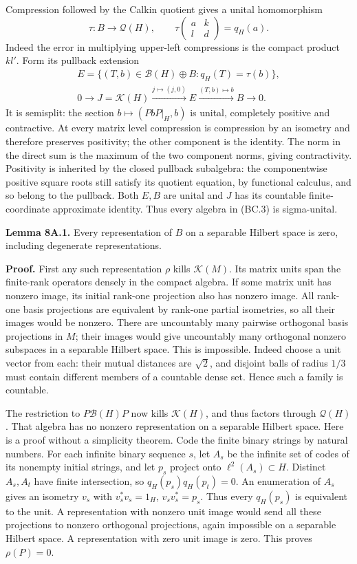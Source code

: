 \documentclass[
  11pt,
]{article}
\begin{document}
Compression followed by the Calkin quotient gives a unital homomorphism
\[
 \tau:B\longrightarrow\mathcal Q(H),\qquad
 \tau\begin{pmatrix}a&k\\l&d\end{pmatrix}=q_H(a).
 \tag{BC.2}
\] Indeed the error in multiplying upper-left compressions is the
compact product \(kl'\). Form its pullback extension \[
 \begin{gathered}
 E=\{(T,b)\in\mathcal B(H)\oplus B:q_H(T)=\tau(b)\},\\
 0\longrightarrow J=\mathcal K(H)
 \xrightarrow{j\mapsto(j,0)}E
 \xrightarrow{(T,b)\mapsto b}B\longrightarrow0.
 \end{gathered}
 \tag{BC.3}
\] It is semisplit: the section \(b\mapsto(PbP|_H,b)\) is unital,
completely positive and contractive. At every matrix level compression
is compression by an isometry and therefore preserves positivity; the
other component is the identity. The norm in the direct sum is the
maximum of the two component norms, giving contractivity. Positivity is
inherited by the closed pullback subalgebra: the componentwise positive
square roots still satisfy its quotient equation, by functional
calculus, and so belong to the pullback. Both \(E,B\) are unital and
\(J\) has its countable finite-coordinate approximate identity. Thus
every algebra in (BC.3) is sigma-unital.

\textbf{Lemma 8A.1.} Every representation of \(B\) on a separable
Hilbert space is zero, including degenerate representations.

\textbf{Proof.} First any such representation \(\rho\) kills
\(\mathcal K(M)\). Its matrix units span the finite-rank operators
densely in the compact algebra. If some matrix unit has nonzero image,
its initial rank-one projection also has nonzero image. All rank-one
basis projections are equivalent by rank-one partial isometries, so all
their images would be nonzero. There are uncountably many pairwise
orthogonal basis projections in \(M\); their images would give
uncountably many orthogonal nonzero subspaces in a separable Hilbert
space. This is impossible. Indeed choose a unit vector from each: their
mutual distances are \(\sqrt2\), and disjoint balls of radius \(1/3\)
must contain different members of a countable dense set. Hence such a
family is countable.

The restriction to \(P\mathcal B(H)P\) now kills \(\mathcal K(H)\), and
thus factors through \(\mathcal Q(H)\). That algebra has no nonzero
representation on a separable Hilbert space. Here is a proof without a
simplicity theorem. Code the finite binary strings by natural numbers.
For each infinite binary sequence \(s\), let \(A_s\) be the infinite set
of codes of its nonempty initial strings, and let \(p_s\) project onto
\(\ell^2(A_s)\subset H\). Distinct \(A_s,A_t\) have finite intersection,
so \(q_H(p_s)q_H(p_t)=0\). An enumeration of \(A_s\) gives an isometry
\(v_s\) with \(v_s^*v_s=1_H\), \(v_sv_s^*=p_s\). Thus every \(q_H(p_s)\)
is equivalent to the unit. A representation with nonzero unit image
would send all these projections to nonzero orthogonal projections,
again impossible on a separable Hilbert space. A representation with
zero unit image is zero. This proves \(\rho(P)=0\).
\end{document}
